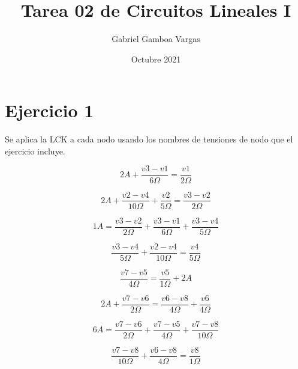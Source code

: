 \documentclass{article}
\title{Tarea 02 de Circuitos Lineales I}
\author{Gabriel Gamboa Vargas}
\date{Octubre 2021}
\begin{document}
\maketitle

\section{Ejercicio 1}
Se aplica la LCK a cada nodo usando los nombres de tensiones de nodo que el ejercicio incluye.

\begin{equation} 
    2A + \frac{v3-v1}{6\Omega} = \frac{v1}{2\Omega}
\end{equation}

\begin{equation}
    2A + \frac{v2-v4}{10\Omega} + \frac{v2}{5\Omega} = \frac{v3-v2}{2\Omega}
\end{equation}
    
\begin{equation}
    1A = \frac{v3-v2}{2\Omega} + \frac{v3-v1}{6\Omega} + \frac{v3-v4}{5\Omega}
\end{equation}

\begin{equation}
    \frac{v3-v4}{5\Omega} + \frac{v2-v4}{10\Omega} = \frac{v4}{5\Omega}
\end{equation}

\begin{equation}
    \frac{v7-v5}{4\Omega} = \frac{v5}{1\Omega} + 2A
\end{equation}
    
\begin{equation}
    2A + \frac{v7-v6}{2\Omega} = \frac{v6-v8}{4\Omega} + \frac{v6}{4\Omega}
\end{equation}

\begin{equation}
    6A = \frac{v7-v6}{2\Omega} + \frac{v7-v5}{4\Omega} + \frac{v7-v8}{10\Omega}
\end{equation}

\begin{equation}
    \frac{v7-v8}{10\Omega} + \frac{v6-v8}{4\Omega} = \frac{v8}{1\Omega}
\end{equation}
\end{document}
